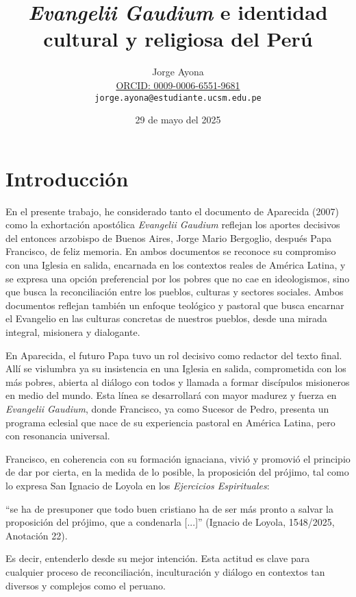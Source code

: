 \documentclass[12pt]{article}
\title{\textit{Evangelii Gaudium} e identidad cultural y religiosa del Perú}
\author{Jorge Ayona\\
	{\footnotesize \protect\href{https://orcid.org/0009-0006-6551-9681}{ORCID: 0009-0006-6551-9681}}\\
	\texttt{jorge.ayona@estudiante.ucsm.edu.pe}}
\date{29 de mayo del 2025}
\begin{document}
	\maketitle
	\newpage
	\onehalfspacing
	
	\section*{Introducción}
	
	En el presente trabajo, he considerado tanto el documento de Aparecida (2007)\nocite{CELAM2007} como la exhortación apostólica \textit{Evangelii Gaudium}\nocite{Francisco2013} reflejan los aportes decisivos del entonces arzobispo de Buenos Aires, Jorge Mario Bergoglio, después Papa Francisco, de feliz memoria. En ambos documentos se reconoce su compromiso con una Iglesia en salida, encarnada en los contextos reales de América Latina, y se expresa una opción preferencial por los pobres que no cae en ideologismos, sino que busca la reconciliación entre los pueblos, culturas y sectores sociales. Ambos documentos reflejan también un enfoque teológico y pastoral que busca encarnar el Evangelio en las culturas concretas de nuestros pueblos, desde una mirada integral, misionera y dialogante.
	
	En Aparecida, el futuro Papa tuvo un rol decisivo como redactor del texto final. Allí se vislumbra ya su insistencia en una Iglesia en salida, comprometida con los más pobres, abierta al diálogo con todos y llamada a formar discípulos misioneros en medio del mundo. Esta línea se desarrollará con mayor madurez y fuerza en \textit{Evangelii Gaudium}, donde Francisco, ya como Sucesor de Pedro, presenta un programa eclesial que nace de su experiencia pastoral en América Latina, pero con resonancia universal.
	
	Francisco, en coherencia con su formación ignaciana, vivió y promovió el principio de dar por cierta, en la medida de lo posible, la proposición del prójimo, tal como lo expresa San Ignacio de Loyola en los \textit{Ejercicios Espirituales}\nocite{Ignacio1548}: 
	\begin{displayquote}
		“se ha de presuponer que todo buen cristiano ha de ser más pronto a salvar la proposición del prójimo, que a condenarla [...]” (Ignacio de Loyola, 1548/2025, Anotación 22).
	\end{displayquote}
	Es decir, entenderlo desde su mejor intención. Esta actitud es clave para cualquier proceso de reconciliación, inculturación y diálogo en contextos tan diversos y complejos como el peruano.
	
\end{document}
